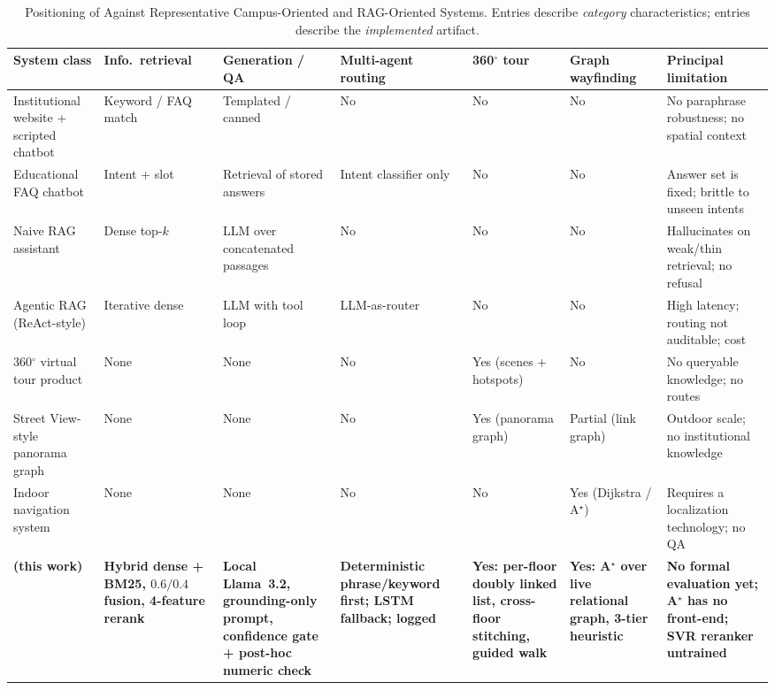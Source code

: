 \begin{table}[!t]
\centering
\caption{Positioning of \system{} Against Representative Campus-Oriented and RAG-Oriented Systems.
Entries describe \emph{category} characteristics; \system{} entries describe the \emph{implemented} artifact.}
\label{tab:comparison}
\footnotesize
\renewcommand{\arraystretch}{1.25}
\begin{tabular}{@{}p{2.7cm}p{2.1cm}p{2.0cm}p{1.9cm}p{1.6cm}p{1.7cm}p{3.0cm}@{}}
\toprule
\textbf{System class} & \textbf{Info.\ retrieval} & \textbf{Generation / QA} & \textbf{Multi-agent routing} & \textbf{360$^{\circ}$ tour} & \textbf{Graph wayfinding} & \textbf{Principal limitation} \\
\midrule
Institutional website + scripted chatbot &
Keyword / FAQ match &
Templated / canned &
No &
No &
No &
No paraphrase robustness; no spatial context \\

Educational FAQ chatbot \cite{okonkwo2021chatbots,perez2020chatbots} &
Intent + slot &
Retrieval of stored answers &
Intent classifier only &
No &
No &
Answer set is fixed; brittle to unseen intents \\

Naive RAG assistant \cite{lewis2020rag,gao2023ragsurvey} &
Dense top-$k$ &
LLM over concatenated passages &
No &
No &
No &
Hallucinates on weak/thin retrieval; no refusal \\

Agentic RAG (ReAct-style) \cite{yao2023react,wu2023autogen} &
Iterative dense &
LLM with tool loop &
LLM-as-router &
No &
No &
High latency; routing not auditable; cost \\

360$^{\circ}$ virtual tour product \cite{argyriou2020360design,petroff2019pannellum} &
None &
None &
No &
Yes (scenes + hotspots) &
No &
No queryable knowledge; no routes \\

Street View-style panorama graph \cite{anguelov2010streetview} &
None &
None &
No &
Yes (panorama graph) &
Partial (link graph) &
Outdoor scale; no institutional knowledge \\

Indoor navigation system \cite{fallah2013indoor,zafari2019localization} &
None &
None &
No &
No &
Yes (Dijkstra / A$^{\star}$) &
Requires a localization technology; no QA \\

\midrule
\textbf{\system{} (this work)} &
\textbf{Hybrid dense + BM25, $0.6/0.4$ fusion, 4-feature rerank} &
\textbf{Local Llama~3.2, grounding-only prompt, confidence gate + post-hoc numeric check} &
\textbf{Deterministic phrase/keyword first; LSTM fallback; logged} &
\textbf{Yes: per-floor doubly linked list, cross-floor stitching, guided walk} &
\textbf{Yes: A$^{\star}$ over live relational graph, 3-tier heuristic} &
\textbf{No formal evaluation yet; A$^{\star}$ has no front-end; SVR reranker untrained} \\
\bottomrule
\end{tabular}
\end{table}

